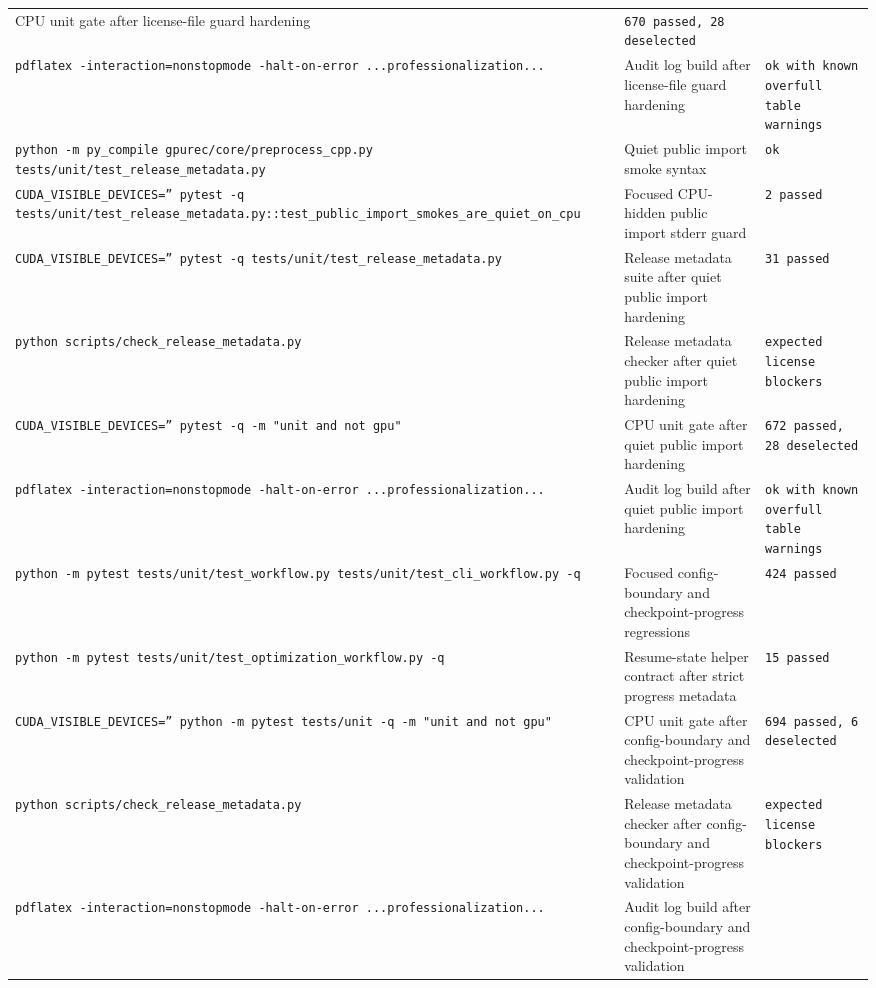 \documentclass[11pt]{article}
\begin{document}
\begin{center}
\begin{tabular}{lll}
CPU unit gate after license-file guard hardening &
\texttt{670 passed, 28 deselected} \\
\texttt{pdflatex -interaction=nonstopmode -halt-on-error ...professionalization...} &
Audit log build after license-file guard hardening &
\texttt{ok with known overfull table warnings} \\
\texttt{python -m py\_compile gpurec/core/preprocess\_cpp.py tests/unit/test\_release\_metadata.py} &
Quiet public import smoke syntax &
\texttt{ok} \\
\texttt{CUDA\_VISIBLE\_DEVICES='' pytest -q tests/unit/test\_release\_metadata.py::test\_public\_import\_smokes\_are\_quiet\_on\_cpu} &
Focused CPU-hidden public import stderr guard &
\texttt{2 passed} \\
\texttt{CUDA\_VISIBLE\_DEVICES='' pytest -q tests/unit/test\_release\_metadata.py} &
Release metadata suite after quiet public import hardening &
\texttt{31 passed} \\
\texttt{python scripts/check\_release\_metadata.py} &
Release metadata checker after quiet public import hardening &
\texttt{expected license blockers} \\
\texttt{CUDA\_VISIBLE\_DEVICES='' pytest -q -m "unit and not gpu"} &
CPU unit gate after quiet public import hardening &
\texttt{672 passed, 28 deselected} \\
\texttt{pdflatex -interaction=nonstopmode -halt-on-error ...professionalization...} &
Audit log build after quiet public import hardening &
\texttt{ok with known overfull table warnings} \\
\texttt{python -m pytest tests/unit/test\_workflow.py tests/unit/test\_cli\_workflow.py -q} &
Focused config-boundary and checkpoint-progress regressions &
\texttt{424 passed} \\
\texttt{python -m pytest tests/unit/test\_optimization\_workflow.py -q} &
Resume-state helper contract after strict progress metadata &
\texttt{15 passed} \\
\texttt{CUDA\_VISIBLE\_DEVICES='' python -m pytest tests/unit -q -m "unit and not gpu"} &
CPU unit gate after config-boundary and checkpoint-progress validation &
\texttt{694 passed, 6 deselected} \\
\texttt{python scripts/check\_release\_metadata.py} &
Release metadata checker after config-boundary and checkpoint-progress validation &
\texttt{expected license blockers} \\
\texttt{pdflatex -interaction=nonstopmode -halt-on-error ...professionalization...} &
Audit log build after config-boundary and checkpoint-progress validation &

\end{tabular}
\end{center}
\end{document}
